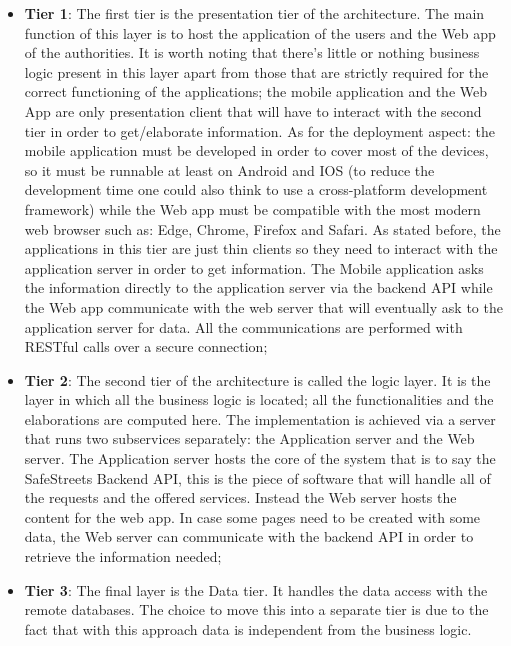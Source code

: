 \begin{itemize}
  \item \textbf{Tier 1}: The first tier is the presentation tier of the architecture. The main function of this layer is to host  the application of the users and the Web app of the authorities. It is worth noting that there's little or nothing business logic present in this layer apart from those that are strictly required for the correct functioning of the applications; the mobile application and the Web App are only presentation client that will have to interact with the second tier in order to get/elaborate information. As for the deployment aspect: the mobile application must be developed in order to cover most of the devices, so it must be runnable at least on Android and IOS (to reduce the development time one could also think to use a cross-platform development framework) while the Web app must be compatible with the most modern web browser such as: Edge, Chrome, Firefox and Safari. As stated before, the applications in this tier are just thin clients so they need to interact with the application server in order to get information. The Mobile application asks the information directly to the application server via the backend API while the Web app communicate with the web server that will eventually ask to the application server for data. All the communications are performed with RESTful calls over a secure connection;
  \item \textbf{Tier 2}: The second tier of the architecture is called the logic layer. It is the layer in which all the business logic is located; all the functionalities and the elaborations are computed here. The implementation is achieved via a server that runs two subservices separately: the Application server and the Web server. The Application server hosts the core of the system that is to say the SafeStreets Backend API, this is the piece of software that will handle all of the requests and the offered services. Instead the Web server hosts the content for the web app. In case some pages need to be created with some data, the Web server can communicate with the backend API in order to retrieve the information needed;
  \item \textbf{Tier 3}: The final layer is the Data tier. It handles the data access with the remote databases. The choice to move this into a separate tier is due to the fact that with this approach data is independent from the business logic.
\end{itemize}
